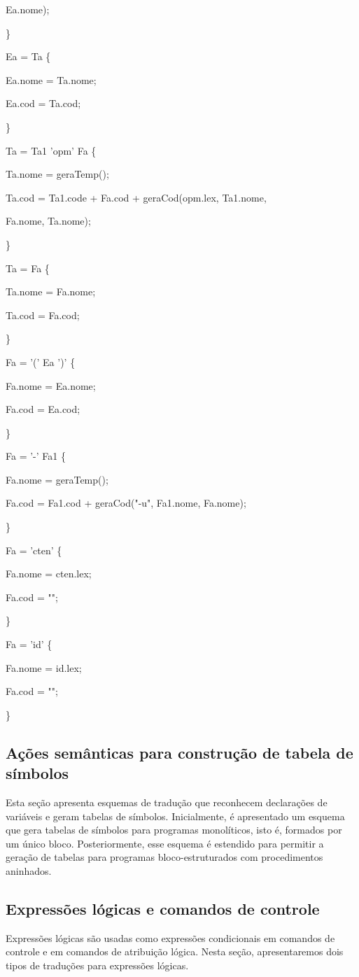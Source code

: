 \documentclass[11pt]{article}
\begin{document}
Ea.nome);

\}

Ea = Ta \{ 

Ea.nome = Ta.nome;

Ea.cod = Ta.cod;

\}

Ta = Ta1 'opm' Fa \{ 

Ta.nome = geraTemp();

Ta.cod = Ta1.code + Fa.cod + geraCod(opm.lex, Ta1.nome,

Fa.nome, Ta.nome);

\}

Ta = Fa \{

Ta.nome = Fa.nome;

Ta.cod = Fa.cod;

\}

Fa = '(' Ea ')' \{

Fa.nome = Ea.nome;

Fa.cod = Ea.cod;

\}

Fa = '-' Fa1 \{

Fa.nome = geraTemp();

Fa.cod = Fa1.cod + geraCod("-u", Fa1.nome, Fa.nome);

\}

Fa = 'cten' \{

Fa.nome = cten.lex;

Fa.cod = "";

\}

Fa = 'id' \{

Fa.nome = id.lex;

Fa.cod = "";

\}


\subsection{Ações semânticas para construção de tabela de símbolos}
\label{sec:orgadfa34d}
Esta seção apresenta esquemas de tradução que reconhecem
declarações de variáveis e geram tabelas de símbolos. Inicialmente,
é apresentado um esquema que gera tabelas de símbolos para
programas monolíticos, isto é, formados por um único
bloco. Posteriormente, esse esquema é estendido para permitir a
geração de tabelas para programas bloco-estruturados com
procedimentos aninhados.


\subsection{Expressões lógicas e comandos de controle}
\label{sec:orgd6bb2b8}
Expressões lógicas são usadas como expressões condicionais em
comandos de controle e em comandos de atribuição lógica. Nesta
seção, apresentaremos dois tipos de traduções para expressões
lógicas.
\end{document}
